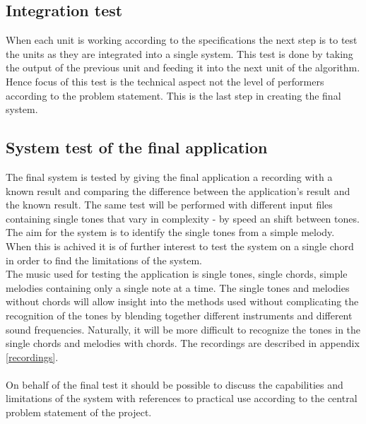 \subsection{Integration test}
When each unit is working according to the specifications the next step is to test the units as they are integrated into a single system. This test is done by taking the output of the previous unit and feeding it into the next unit of the algorithm. Hence focus of this test is the technical aspect not the level of performers according to the problem statement. This is the last step in creating the final system.

\subsection{System test of the final application}
The final system is tested by giving the final application a recording with a known result and comparing the difference between the application's result and the known result. The same test will be performed with different input files containing single tones that vary in complexity - by speed an shift between tones. The aim for the system is to identify the single tones from a simple melody. \\
When this is achived it is of further interest to test the system on a single chord in order to find the limitations of the system.  
\\
The music used for testing the application is single tones, single chords, simple melodies containing only a single note at a time. The single tones and melodies without chords will allow insight into the methods used without complicating the recognition of the tones by blending together different instruments and different sound frequencies. Naturally, it will be more difficult to recognize the tones in the single chords and melodies with chords. The recordings are described in appendix \ref{recordings}. \\
\\
On behalf of the final test it should be possible to discuss the capabilities and limitations of the system with references to practical use according to the central problem statement of the project.  